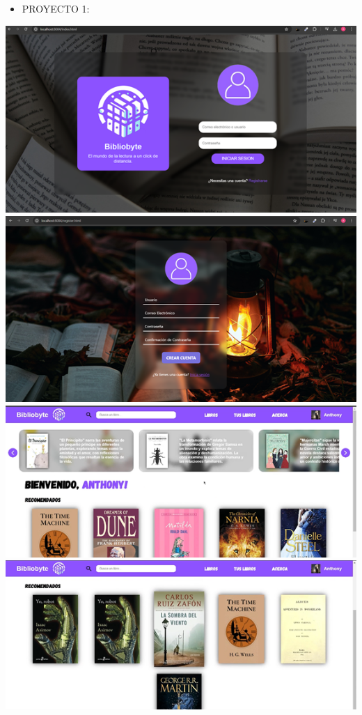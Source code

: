 \documentclass{article}
\begin{document}
\begin{itemize}		
    \item 
    PROYECTO 1:
\end{itemize}
\includegraphics[width=1\textwidth]{img/18.png} 
\includegraphics[width=1\textwidth]{img/19.png} 
\includegraphics[width=1\textwidth]{img/20.png} 
\includegraphics[width=1\textwidth]{img/21.png} 
\end{document}
